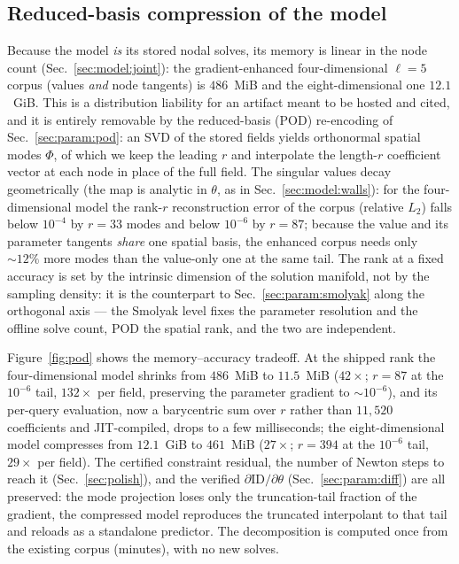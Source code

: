 \documentclass[
  aps,
  prd,
  twocolumn,
  amsmath,
  amssymb,
  nofootinbib,
  superscriptaddress,
  floatfix,
]{revtex4-2}
\begin{document}
\subsection{Reduced-basis compression of the model}
\label{sec:model:pod}

Because the model \emph{is} its stored nodal solves, its memory is linear in the
node count (Sec.~\ref{sec:model:joint}): the gradient-enhanced four-dimensional
$\ell=5$ corpus (values \emph{and} node tangents) is $486$~MiB and the
eight-dimensional one $12.1$~GiB. This is a distribution liability for an artifact
meant to be hosted and cited, and it is entirely removable by the reduced-basis
(POD) re-encoding of Sec.~\ref{sec:param:pod}: an SVD of the stored fields yields
orthonormal spatial modes $\Phi$, of which we keep the leading $r$ and interpolate
the length-$r$ coefficient vector at each node in place of the full field. The
singular values decay geometrically (the map is analytic in $\theta$, as in
Sec.~\ref{sec:model:walls}): for the four-dimensional model the rank-$r$
reconstruction error of the corpus (relative $L_2$) falls below $10^{-4}$ by
$r=33$ modes and below $10^{-6}$ by $r=87$; because the value and its parameter
tangents \emph{share} one spatial basis, the enhanced corpus needs only
$\sim\!12\%$ more modes than the value-only one at the same tail. The rank at a
fixed accuracy is set by the intrinsic dimension of the solution manifold, not by
the sampling density: it is the counterpart to Sec.~\ref{sec:param:smolyak} along
the orthogonal axis --- the Smolyak level fixes the parameter resolution and the
offline solve count, POD the spatial rank, and the two are independent.

Figure~\ref{fig:pod} shows the memory--accuracy tradeoff. At the shipped rank the four-dimensional
model shrinks from $486$~MiB to $11.5$~MiB ($42\times$; $r=87$ at the $10^{-6}$
tail, $132\times$ per field, preserving the parameter gradient to $\sim\!10^{-6}$),
and its per-query evaluation, now a barycentric sum over $r$ rather than $11{,}520$
coefficients and JIT-compiled, drops to a few milliseconds;
the eight-dimensional model compresses from $12.1$~GiB to $461$~MiB ($27\times$;
$r=394$ at the $10^{-6}$ tail, $29\times$ per field). The certified constraint
residual, the number of Newton steps to reach it (Sec.~\ref{sec:polish}), and the
verified $\partial\text{ID}/\partial\theta$ (Sec.~\ref{sec:param:diff}) are all
preserved: the mode projection loses only the truncation-tail fraction of the
gradient, the compressed model reproduces the truncated interpolant to that tail
and reloads as a standalone predictor. The decomposition is computed once from the
existing corpus (minutes), with no new solves.
\end{document}

